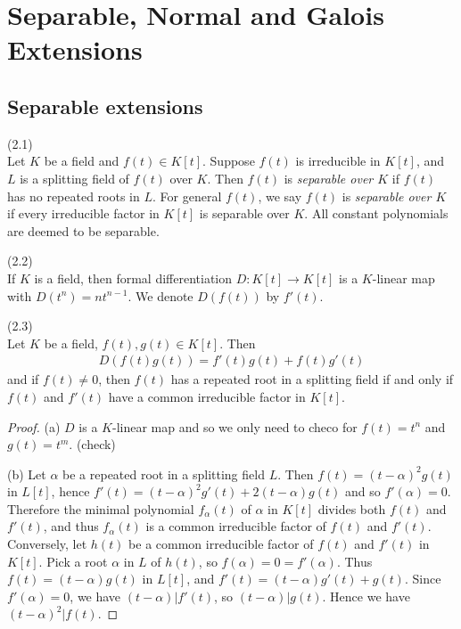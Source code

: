 \documentclass[a4paper]{article}
\begin{document}
\section{Separable, Normal and Galois Extensions}

\subsection{Separable extensions}

\begin{defi} (2.1)\\
Let $K$ be a field and $f(t) \in K[t]$. Suppose $f(t)$ is irreducible in $K[t]$, and $L$ is a splitting field of $f(t)$ over $K$. Then $f(t)$ is \emph{separable over $K$} if $f(t)$ has no repeated roots in $L$. For general $f(t)$, we say $f(t)$ is \emph{separable over $K$} if every irreducible factor in $K[t]$ is separable over $K$. All constant polynomials are deemed to be separable.
\end{defi}

\begin{defi} (2.2)\\
If $K$ is a field, then formal differentiation $D:K[t] \to K[t]$ is a $K$-linear map with $D(t^n) = nt^{n-1}$. We denote $D(f(t))$ by $f'(t)$.
\end{defi}

\begin{lemma} (2.3)\\
Let $K$ be a field, $f(t),g(t) \in K[t]$. Then
\begin{equation*}
\begin{aligned}
D(f(t)g(t)) = f'(t)g(t)+f(t)g'(t)
\end{aligned}
\end{equation*}
and if $f(t) \neq 0$, then $f(t)$ has a repeated root in a splitting field if and only if $f(t)$ and $f'(t)$ have a common irreducible factor in $K[t]$.
\begin{proof}
(a) $D$ is a $K$-linear map and so we only need to checo for $f(t) = t^n$ and $g(t) = t^m$. (check)

(b) Let $\alpha$ be a repeated root in a splitting field $L$. Then $f(t) = (t-\alpha)^2g(t)$ in $L[t]$, hence $f'(t) = (t-\alpha)^2 g'(t) + 2(t-\alpha)g(t)$ and so $f'(\alpha) = 0$. Therefore the minimal polynomial $f_\alpha(t)$ of $\alpha$ in $K[t]$ divides both $f(t)$ and $f'(t)$, and thus $f_\alpha(t)$ is a common irreducible factor of $f(t)$ and $f'(t)$. Conversely, let $h(t)$ be a common irreducible factor of $f(t)$ and $f'(t)$ in $K[t]$. Pick a root $\alpha$ in $L$ of $h(t)$, so $f(\alpha) = 0 = f'(\alpha)$. Thus $f(t) = (t-\alpha) g(t)$ in $L[t]$, and $f'(t) = (t-\alpha) g'(t) + g(t)$. Since $f'(\alpha) =0 $, we have $(t-\alpha) | f'(t)$, so $(t-\alpha)|g(t)$. Hence we have $(t-\alpha)^2 | f(t)$.
\end{proof}
\end{lemma}
\end{document}
